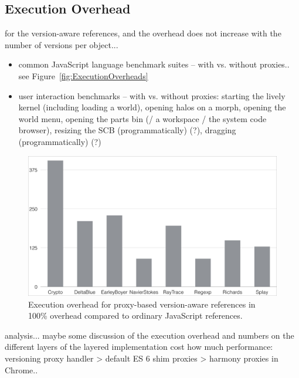 \subsection{Execution Overhead}

for the version-aware references, and the overhead does not increase with the number of versions per object...
\begin{itemize}
    \item common JavaScript language benchmark suites – with vs. without proxies.. see Figure~\ref{fig:ExecutionOverheads}
    \item user interaction benchmarks – with vs. without proxies: starting the lively kernel (including loading a world), opening halos on a morph, opening the world menu, opening the parts bin (/ a workspace / the system code browser), resizing the SCB (programmatically) (?), dragging (programmatically) (?)
\end{itemize}


\begin{figure}[h]
    \centering
    \includegraphics[width=\textwidth]{figures/executionOverhead.pdf}
    \caption{Execution overhead for proxy-based version-aware references in 100\% overhead compared to ordinary JavaScript references.}
    \label{fig:ExecutionOverhead}
\end{figure}



analysis...
maybe some discussion of the execution overhead and numbers on the different layers of the layered implementation cost how much performance: versioning proxy handler > default ES 6 shim proxies > harmony proxies in Chrome..



